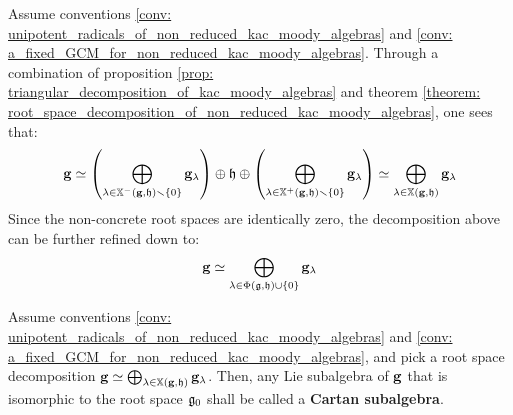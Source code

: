             \begin{remark}
                Assume conventions \ref{conv: unipotent_radicals_of_non_reduced_kac_moody_algebras} and \ref{conv: a_fixed_GCM_for_non_reduced_kac_moody_algebras}. Through a combination of proposition \ref{prop: triangular_decomposition_of_kac_moody_algebras} and theorem \ref{theorem: root_space_decomposition_of_non_reduced_kac_moody_algebras}, one sees that:
                    $$\mathbf{g} \simeq \left( \bigoplus_{\lambda \in \mathbb{X}^-(\mathbf{g}, \mathfrak{h}) \smallsetminus \{0\}} \mathbf{g}_{\lambda} \right) \oplus \mathfrak{h} \oplus \left( \bigoplus_{\lambda \in \mathbb{X}^+(\mathbf{g}, \mathfrak{h}) \smallsetminus \{0\}} \mathbf{g}_{\lambda} \right) \simeq \bigoplus_{\lambda \in \mathbb{X}(\mathbf{g}, \mathfrak{h})} \mathbf{g}_{\lambda}$$
                Since the non-concrete root spaces are identically zero, the decomposition above can be further refined down to:
                    $$\mathbf{g} \simeq \bigoplus_{\lambda \in \Phi(\mathfrak{g}, \mathfrak{h}) \cup \{0\}} \mathbf{g}_{\lambda}$$
            \end{remark}
            \begin{definition} \label{def: cartan_subalgebras_of_non_reduced_kac_moody_algebras}
                Assume conventions \ref{conv: unipotent_radicals_of_non_reduced_kac_moody_algebras} and \ref{conv: a_fixed_GCM_for_non_reduced_kac_moody_algebras}, and pick a root space decomposition $\mathbf{g} \simeq \bigoplus_{\lambda \in \mathbb{X}(\mathbf{g}, \mathfrak{h})} \mathbf{g}_{\lambda}$. Then, any Lie subalgebra of $\mathbf{g}$ that is isomorphic to the root space $\mathfrak{g}_0$ shall be called a \textbf{Cartan subalgebra}.
            \end{definition}
                
